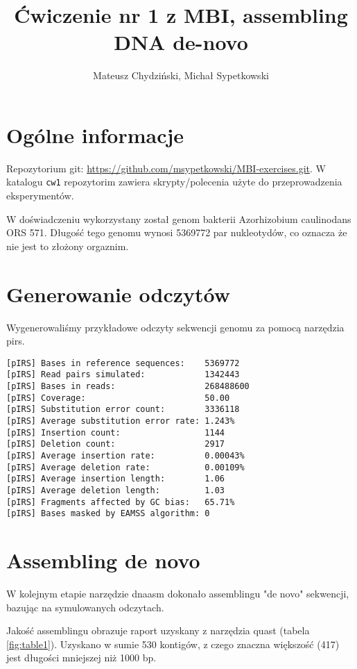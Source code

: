 \documentclass[a4paper]{article}
\begin{document}
\title{Ćwiczenie nr 1 z MBI, assembling DNA de-novo}
\author{Mateusz Chydziński, Michał Sypetkowski}
\maketitle

\section{Ogólne informacje}
Repozytorium git: \url{https://github.com/msypetkowski/MBI-exercises.git}.
W katalogu \texttt{cw1} repozytorim zawiera skrypty/polecenia użyte do przeprowadzenia eksperymentów.

W doświadczeniu wykorzystany został genom bakterii Azorhizobium caulinodans ORS 571.
Długość tego genomu wynosi 5369772 par nukleotydów,
co oznacza że nie jest to złożony orgaznim.


\section{Generowanie odczytów}

Wygenerowaliśmy przykładowe odczyty sekwencji genomu za pomocą narzędzia pirs.

\begin{verbatim}
[pIRS] Bases in reference sequences:    5369772
[pIRS] Read pairs simulated:            1342443
[pIRS] Bases in reads:                  268488600
[pIRS] Coverage:                        50.00
[pIRS] Substitution error count:        3336118
[pIRS] Average substitution error rate: 1.243%
[pIRS] Insertion count:                 1144
[pIRS] Deletion count:                  2917
[pIRS] Average insertion rate:          0.00043%
[pIRS] Average deletion rate:           0.00109%
[pIRS] Average insertion length:        1.06
[pIRS] Average deletion length:         1.03
[pIRS] Fragments affected by GC bias:   65.71%
[pIRS] Bases masked by EAMSS algorithm: 0
\end{verbatim}

\section{Assembling de novo}

W kolejnym etapie narzędzie dnaasm dokonało assemblingu "de novo" sekwencji,
bazując na symulowanych odczytach.

Jakość assemblingu obrazuje raport uzyskany z narzędzia quast (tabela \ref{fig:table1}).
Uzyskano w sumie 530 kontigów, z czego znaczna większość (417) jest długości mniejszej niż 1000 bp.
\end{document}
